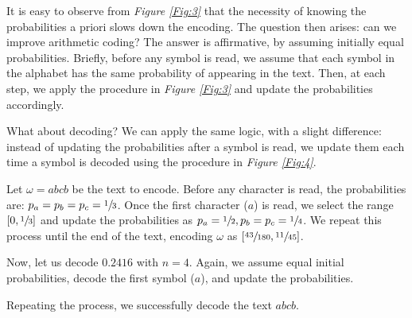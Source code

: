 \documentclass{subfiles}
\begin{document}
    It is easy to observe from \emph{Figure \ref{Fig:3}} 
        that the necessity of knowing the probabilities a priori slows down the encoding. 
    The question then arises: can we improve arithmetic coding? 
    The answer is affirmative, by assuming initially equal probabilities.
    Briefly, before any symbol is read, 
        we assume that each symbol in the alphabet has the same probability of appearing in the text.
    Then, at each step, we apply the procedure in \emph{Figure \ref{Fig:3}}
        and update the probabilities accordingly.

    What about decoding? We can apply the same logic, with a slight difference:
        instead of updating the probabilities after a symbol is read, 
        we update them each time a symbol is decoded using the procedure in \emph{Figure \ref{Fig:4}}.

    \begin{example*}
        Let \(\omega = abcb\) be the text to encode. 
        Before any character is read, the probabilities are: 
        \(p_{a} = p_{b} = p_{c} = \sfrac{1}{3}\).
        Once the first character (\(a\)) is read, we select the range 
        \([0, \sfrac{1}{3}]\) and update the probabilities as 
        \(p_{a} = \sfrac{1}{2}, p_{b} = p_{c} = \sfrac{1}{4}\).
        We repeat this process until the end of the text,
            encoding \(\omega\) as \([\sfrac{43}{180}, \sfrac{11}{45}]\).
        

        Now, let us decode \(0.2416\) with \(n = 4\).
        Again, we assume equal initial probabilities, 
            decode the first symbol (\(a\)), and update the probabilities.
        
        
        \noindent Repeating the process, we successfully decode the text \(abcb\).
    \end{example*}
    \clearpage
\end{document}
